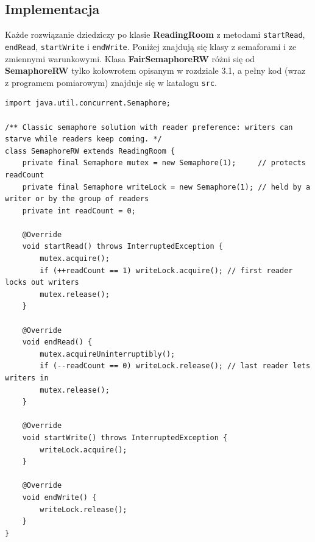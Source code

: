 \documentclass[11pt,a4paper]{article}
\begin{document}
\subsection{Implementacja}
Każde rozwiązanie dziedziczy po klasie \textbf{ReadingRoom} z metodami \texttt{startRead},
\texttt{endRead}, \texttt{startWrite} i \texttt{endWrite}. Poniżej znajdują się klasy z semaforami
i ze zmiennymi warunkowymi. Klasa \textbf{FairSemaphoreRW} różni się od \textbf{SemaphoreRW} tylko
kołowrotem opisanym w rozdziale 3.1, a pełny kod (wraz z programem pomiarowym) znajduje się w katalogu \texttt{src}.

\begin{lstlisting}[caption={Klasa \textbf{SemaphoreRW} (\texttt{src/SemaphoreRW.java})}]
import java.util.concurrent.Semaphore;

/** Classic semaphore solution with reader preference: writers can starve while readers keep coming. */
class SemaphoreRW extends ReadingRoom {
    private final Semaphore mutex = new Semaphore(1);     // protects readCount
    private final Semaphore writeLock = new Semaphore(1); // held by a writer or by the group of readers
    private int readCount = 0;

    @Override
    void startRead() throws InterruptedException {
        mutex.acquire();
        if (++readCount == 1) writeLock.acquire(); // first reader locks out writers
        mutex.release();
    }

    @Override
    void endRead() {
        mutex.acquireUninterruptibly();
        if (--readCount == 0) writeLock.release(); // last reader lets writers in
        mutex.release();
    }

    @Override
    void startWrite() throws InterruptedException {
        writeLock.acquire();
    }

    @Override
    void endWrite() {
        writeLock.release();
    }
}
\end{lstlisting}
\end{document}
